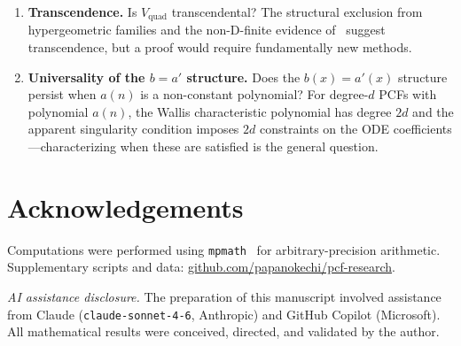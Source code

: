 \documentclass[11pt,a4paper]{article}
\theoremstyle{definition}
\theoremstyle{remark}
\newcommand{\Vq}{V_{\mathrm{quad}}}
\begin{document}
\begin{enumerate}
\item \textbf{Transcendence.}
  Is $\Vq$ transcendental? The structural
  exclusion from hypergeometric families and
  the non-D-finite evidence
  of~\cite{vquad-exclusion} suggest
  transcendence, but a proof would require
  fundamentally new methods.

\item \textbf{Universality of the $b=a'$
  structure.}
  Does the $b(x)=a'(x)$ structure persist
  when $a(n)$ is a non-constant polynomial?
  For degree-$d$ PCFs with polynomial $a(n)$,
  the Wallis characteristic polynomial has
  degree $2d$ and the apparent singularity
  condition imposes $2d$ constraints on the
  ODE coefficients---characterizing when
  these are satisfied is the general question.
\end{enumerate}


\section*{Acknowledgements}

Computations were performed using
\texttt{mpmath}~\cite{mpmath} for
arbitrary-precision arithmetic.
Supplementary scripts and data:
\href{https://github.com/papanokechi/pcf-research}{%
github.com/papanokechi/pcf-research}.

\smallskip
\noindent\textit{AI assistance disclosure.}
The preparation of this manuscript involved
assistance from Claude
(\texttt{claude-sonnet-4-6}, Anthropic) and
GitHub Copilot (Microsoft).
All mathematical results were conceived,
directed, and validated by the author.
\end{document}
